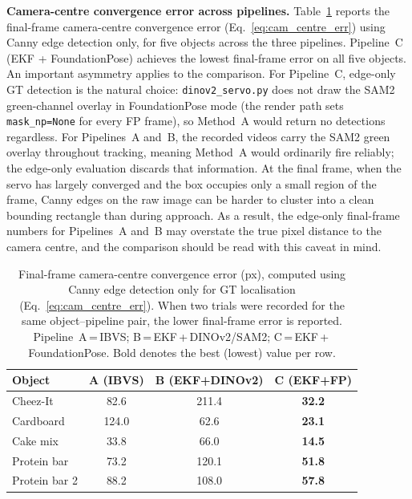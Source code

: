 \documentclass[letterpaper, 10 pt, conference]{ieeeconf}  %
\begin{document}
\textbf{Camera-centre convergence error across pipelines.}
Table~\ref{tab:camera_centre_final_err} reports the final-frame camera-centre convergence error (Eq.~\ref{eq:cam_centre_err}) using Canny edge detection only, for five objects across the three pipelines. Pipeline~C (EKF + FoundationPose) achieves the lowest final-frame error on all five objects. An important asymmetry applies to the comparison. For Pipeline~C, edge-only GT detection is the natural choice: \texttt{dinov2\_servo.py} does not draw the SAM2 green-channel overlay in FoundationPose mode (the render path sets \texttt{mask\_np=None} for every FP frame), so Method~A would return no detections regardless. For Pipelines~A and~B, the recorded videos carry the SAM2 green overlay throughout tracking, meaning Method~A would ordinarily fire reliably; the edge-only evaluation discards that information. At the final frame, when the servo has largely converged and the box occupies only a small region of the frame, Canny edges on the raw image can be harder to cluster into a clean bounding rectangle than during approach. As a result, the edge-only final-frame numbers for Pipelines~A and~B may overstate the true pixel distance to the camera centre, and the comparison should be read with this caveat in mind.

\begin{table}[h]
\centering
\caption{Final-frame camera-centre convergence error (px), computed using Canny edge detection only for GT localisation (Eq.~\ref{eq:cam_centre_err}). When two trials were recorded for the same object--pipeline pair, the lower final-frame error is reported. Pipeline~A\,=\,IBVS; B\,=\,EKF\,+\,DINOv2/SAM2; C\,=\,EKF\,+\,FoundationPose. Bold denotes the best (lowest) value per row.}
\label{tab:camera_centre_final_err}
\footnotesize
\begin{tabular}{@{}lccc@{}}
\toprule
Object & A (IBVS) & B (EKF+DINOv2) & C (EKF+FP) \\
\midrule
Cheez-It      &  82.6 & 211.4 & \textbf{32.2} \\
Cardboard     & 124.0 &  62.6 & \textbf{23.1} \\
Cake mix      &  33.8 &  66.0 & \textbf{14.5} \\
Protein bar   &  73.2 & 120.1 & \textbf{51.8} \\
Protein bar 2 &  88.2 & 108.0 & \textbf{57.8} \\
\bottomrule
\end{tabular}
\end{table}
\end{document}
